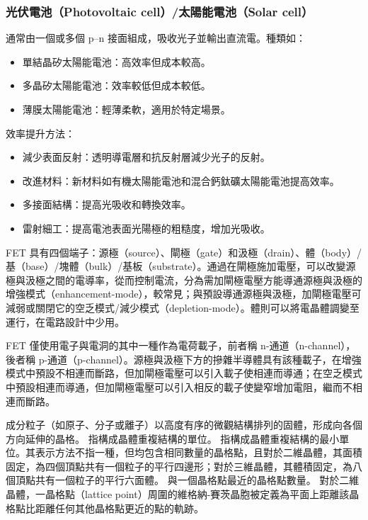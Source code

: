 \documentclass[a4paper,12pt]{report}
\begin{document}
\subsubsection{光伏電池（Photovoltaic cell）/太陽能電池（Solar cell）}
通常由一個或多個 p–n 接面組成，吸收光子並輸出直流電。種類如：
\begin{itemize}
\item 單結晶矽太陽能電池：高效率但成本較高。
\item 多晶矽太陽能電池：效率較低但成本較低。
\item 薄膜太陽能電池：輕薄柔軟，適用於特定場景。
\end{itemize}
效率提升方法：
\begin{itemize}
\item 減少表面反射：透明導電層和抗反射層減少光子的反射。
\item 改進材料：新材料如有機太陽能電池和混合鈣鈦礦太陽能電池提高效率。
\item 多接面結構：提高光吸收和轉換效率。
\item 雷射細工：提高電池表面光陽極的粗糙度，增加光吸收。
\end{itemize}
FET 具有四個端子：源極（source）、閘極（gate）和汲極（drain）、體（body）/基（base）/塊體（bulk）/基板（substrate）。通過在閘極施加電壓，可以改變源極與汲極之間的電導率，從而控制電流，分為需加閘極電壓方能導通源極與汲極的增強模式（enhancement-mode），較常見；與預設導通源極與汲極，加閘極電壓可減弱或關閉它的空乏模式/減少模式（depletion-mode）。體則可以將電晶體調變至運行，在電路設計中少用。

FET 僅使用電子與電洞的其中一種作為電荷載子，前者稱 n-通道（n-channel），後者稱 p-通道（p-channel）。源極與汲極下方的摻雜半導體具有該種載子，在增強模式中預設不相連而斷路，但加閘極電壓可以引入載子使相連而導通；在空乏模式中預設相連而導通，但加閘極電壓可以引入相反的載子使變窄增加電阻，繼而不相連而斷路。



成分粒子（如原子、分子或離子）以高度有序的微觀結構排列的固體，形成向各個方向延伸的晶格。 
指構成晶體重複結構的單位。
指構成晶體重複結構的最小單位。其表示方法不指一種，但均包含相同數量的晶格點，且對於二維晶體，其面積固定，為四個頂點共有一個粒子的平行四邊形；對於三維晶體，其體積固定，為八個頂點共有一個粒子的平行六面體。
與一個晶格點最近的晶格點數量。
對於二維晶體，一晶格點（lattice point）周圍的維格納-賽茨晶胞被定義為平面上距離該晶格點比距離任何其他晶格點更近的點的軌跡。
\end{document}
